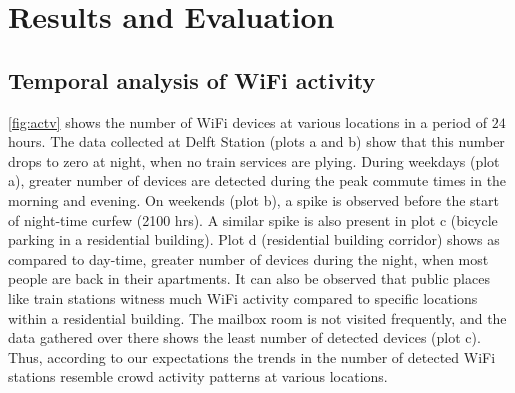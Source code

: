 \section{Results and Evaluation}

\subsection{Temporal analysis of WiFi activity}
\autoref{fig:actv} shows the number of WiFi devices at various locations in a period of $24$ hours. The data collected at Delft Station (plots {a} and {b}) show that this number drops to zero at night, when no train services are plying. During weekdays (plot {a}), greater number of devices are detected during the peak commute times in the morning and evening. On weekends (plot {b}), a spike is observed before the start of night-time curfew (2100 hrs). A similar spike is also present in plot {c} (bicycle parking in a residential building). Plot {d} (residential building corridor) shows as compared to day-time, greater number of devices during the night, when most people are back in their apartments. It can also be observed that public places like train stations witness much WiFi activity compared to specific locations within a residential building. The mailbox room is not visited frequently, and the data gathered over there shows the least number of detected devices (plot {c}). Thus, according to our expectations the trends in the number of detected WiFi stations resemble crowd activity patterns at various locations.

